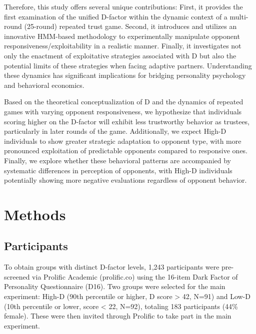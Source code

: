 \documentclass[
]{article}
\begin{document}
Therefore, this study offers several unique contributions: First, it provides the first examination of the unified D-factor within the dynamic context of a multi-round (25-round) repeated trust game. Second, it introduces and utilizes an innovative HMM-based methodology to experimentally manipulate opponent responsiveness/exploitability in a realistic manner. Finally, it investigates not only the enactment of exploitative strategies associated with D but also the potential limits of these strategies when facing adaptive partners. Understanding these dynamics has significant implications for bridging personality psychology and behavioral economics.

Based on the theoretical conceptualization of D and the dynamics of repeated games with varying opponent responsiveness, we hypothesize that individuals scoring higher on the D-factor will exhibit less trustworthy behavior as trustees, particularly in later rounds of the game. Additionally, we expect High-D individuals to show greater strategic adaptation to opponent type, with more pronounced exploitation of predictable opponents compared to responsive ones. Finally, we explore whether these behavioral patterns are accompanied by systematic differences in perception of opponents, with High-D individuals potentially showing more negative evaluations regardless of opponent behavior.

\section{Methods}\label{methods}

\subsection{Participants}\label{participants}

To obtain groups with distinct D-factor levels, 1,243 participants were pre-screened via Prolific Academic (prolific.co) using the 16-item Dark Factor of Personality Questionnaire (D16). Two groups were selected for the main experiment: High-D (90th percentile or higher, D score \textgreater{} 42, N=91) and Low-D (10th percentile or lower, score \textless{} 22, N=92), totaling 183 participants (44\% female). These were then invited through Prolific to take part in the main experiment.
\end{document}
